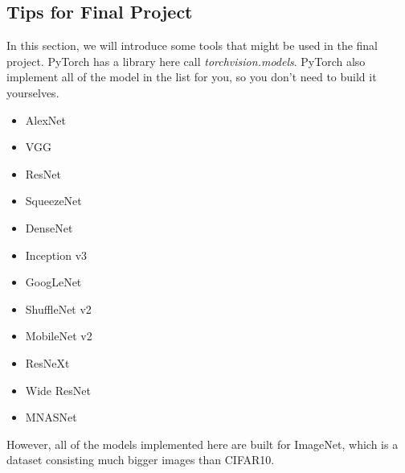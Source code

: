 \subsection{Tips for Final Project} %
In this section, we will introduce some tools that might be used in the final project. PyTorch has a library here call \emph{torchvision.models}. PyTorch also implement all of the model in the list for you, so you don't need to build it yourselves.
\begin{itemize}
\item AlexNet
\item VGG
\item ResNet
\item SqueezeNet
\item DenseNet
\item Inception v3
\item GoogLeNet
\item ShuffleNet v2
\item MobileNet v2
\item ResNeXt
\item Wide ResNet
\item MNASNet
\end{itemize}
However, all of the models implemented here are built for ImageNet, which is a dataset consisting much bigger images than CIFAR10. 

